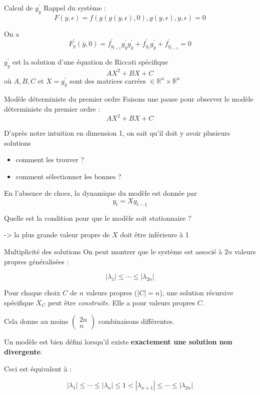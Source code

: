 \documentclass[
  ignorenonframetext,
]{beamer}
\providecommand{\tightlist}{%
  \setlength{\itemsep}{0pt}\setlength{\parskip}{0pt}}
\begin{document}
\begin{frame}{Calcul de \(g^{\prime}_y\)}
\label{calcul-de-gprime_y}
Rappel du système :
\[F(y,\epsilon) = f(g(g(y,\epsilon),0), g(y,\epsilon), y, \epsilon) = 0\]

On a
\[F^{\prime}_y(\overline{y}, 0) = f^{\prime}_{y_{t+1}} g^{\prime}_y g^{\prime}_y + f^{\prime}_{y_{t}} g^{\prime}_y + f^{\prime}_{y_{t-1}} = 0 \]

\pause

\(g^{\prime}_y\) est la solution d'une équation de Riccati spécifique
\[A X^2 + B X + C\] où \(A,B,C\) et \(X=g^{\prime}_y\) sont des matrices
carrées \(\in \mathbb{R}^n \times \mathbb{R}^n\)
\end{frame}

\begin{frame}{Modèle déterministe du premier ordre}
\label{moduxe8le-duxe9terministe-du-premier-ordre}
Faisons une pause pour observer le modèle déterministe du premier ordre
: \[A X^2 + B X + C\]

D'après notre intuition en dimension 1, on sait qu'il doit y avoir
plusieurs solutions

\begin{itemize}
\tightlist
\item
  comment les trouver ?
\item
  comment sélectionner les bonnes ?
\end{itemize}

En l'absence de chocs, la dynamique du modèle est donnée par
\[y_t = X y_{t-1}\]

Quelle est la condition pour que le modèle soit stationnaire ?

\pause

-\textgreater{} la plus grande valeur propre de \(X\) doit être
inférieure à 1

\end{frame}

\begin{frame}{Multiplicité des solutions}
\label{multiplicituxe9-des-solutions}
On peut montrer que le système est associé à \(2 n\) valeurs propres
généralisées :

\[|\lambda_1| \leq \cdots \leq |\lambda_{2 n}|\]

Pour chaque choix \(C\) de \(n\) valeurs propres (\(|C|=n\)), une
solution récursive spécifique \(X_C\) peut être \emph{construite}. Elle
a pour valeurs propres \(C\).

\pause

Cela donne au moins
\(\left(\begin{matrix} 2 n \\ n \end{matrix}\right)\) combinaisons
différentes.

\pause

Un modèle est bien défini lorsqu'il existe \textbf{exactement une
solution non divergente}.

Ceci est équivalent à :

\[|\lambda_1| \leq \cdots \leq |\lambda_{n}| \leq 1 < |\lambda_{n+1}| \leq \cdots \leq |\lambda_{2 n}|\]
\end{frame}
\end{document}
